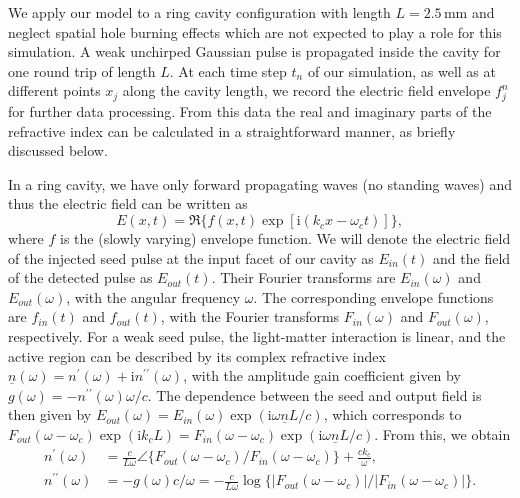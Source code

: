 \documentclass[10pt]{article}
\begin{document}
	We apply our model to a ring cavity configuration with length $L=2.5{\,}%
	\mathrm{mm}$ and neglect spatial hole burning effects which are not expected
	to play a role for this simulation. A weak unchirped Gaussian pulse is
	propagated inside the cavity for one round trip of length $L$. At each time step $t_{n}$ of our
	simulation, as well as at different points $x_{j}$ along the cavity length, we
	record the electric field envelope $f_{j}^{n}$ for further data processing.
	From this data the real and imaginary parts of the refractive index can be
	calculated in a straightforward manner, as briefly discussed below.
	
	In a ring cavity, we have only forward propagating waves (no standing waves)
	and thus the electric field can be written as
	\begin{equation}
		E(x,t)=\Re\{f(x,t)\exp\left[  \mathrm{i}(k_{c}x-\omega_{c}t)\right]
		\} ,
	\end{equation}
	where $f$ is the (slowly varying) envelope function. We will denote the
	electric field of the injected seed pulse at the input facet of our cavity as
	$E_{in}(t)$ and the field of the detected pulse as $E_{out}(t)$. Their Fourier
	transforms are $E_{in}(\omega)$ and $E_{out}(\omega)$, with the angular
	frequency $\omega$. The corresponding envelope functions are $f_{in}\left(
	t\right)  $ and $f_{out}\left(  t\right)  $, with the Fourier transforms
	$F_{in}\left(  \omega\right)  $ and $F_{out}\left(  \omega\right) $, respectively. For a
	weak seed pulse, the light-matter interaction is linear, and the active region
	can be described by its complex refractive index $\underline{n}\left(
	\omega\right)  =n^{\prime}\left(  \omega\right)  +\mathrm{i}n^{\prime\prime
	}\left(  \omega\right)  $, with the amplitude gain coefficient given by
	$g(\omega)=-n^{\prime\prime}(\omega)\omega/c$. The dependence between the seed
	and output field is then given by $E_{out}(\omega)=E_{in}(\omega)\exp\left(
	\mathrm{i}\omega\underline{n}L/c\right)  $, which corresponds to
	$F_{out}(\omega-\omega_{c})\exp(\mathrm{i}k_{c}L)=F_{in}(\omega-\omega
	_{c})\exp\left(  \mathrm{i}\omega\underline{n}L/c\right)  $. From this, we
	obtain
	\begin{align}
		n^{\prime}(\omega)  & =\frac{c}{L\omega}\angle\{F_{out}(\omega-\omega
		_{c})/F_{in}(\omega-\omega_{c})\}+\frac{ck_{c}}{\omega}, \\
		n^{\prime\prime}(\omega)  &  =-g(\omega)c/\omega=-\frac{c}{L\omega}%
		\log\{|F_{out}(\omega-\omega_{c})|/|F_{in}(\omega-\omega_{c})|\}.
		\label{eq:gaineq}%
	\end{align}
	
\end{document}
